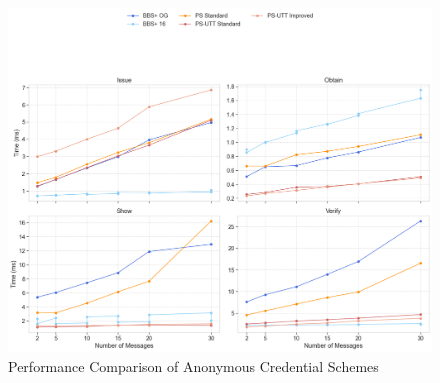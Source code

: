 \begin{figure}
    \centering
    \includegraphics[width=1\linewidth]{comparison-line-graph.png}
    \caption{Performance Comparison of Anonymous Credential Schemes}
    
\end{figure}

